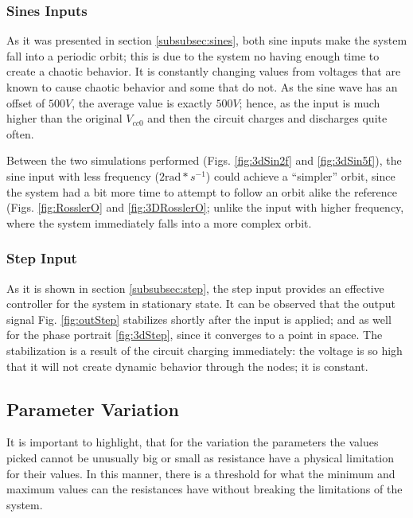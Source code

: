 \subsubsection{Sines Inputs}
As it was presented in section \ref{subsubsec:sines}, both sine inputs make the system fall into a periodic orbit; this is due to the system no having enough time to create a chaotic behavior. It is constantly changing values from voltages that are known to cause chaotic behavior and some that do not. As the sine wave has an offset of $500V$, the average value is exactly $500V$; hence, as the input is much higher than the original $V_{cc0}$ and then the circuit charges and discharges quite often.

Between the two simulations performed (Figs. \ref{fig:3dSin2f} and \ref{fig:3dSin5f}), the sine input with less frequency ($2\text{rad}*s^{-1}$) could achieve a ``simpler'' orbit, since the system had a bit more time to attempt to follow an orbit alike the reference (Figs. \ref{fig:RosslerO} and \ref{fig:3DRosslerO}; unlike the input with higher frequency, where the system immediately falls into a more complex orbit.

\subsubsection{Step Input}\label{subsubsec:stepAn}
As it is shown in section \ref{subsubsec:step}, the step input provides an effective controller for the system in stationary state. It can be observed that the output signal Fig. \ref{fig:outStep} stabilizes shortly after the input is applied; and as well for the phase portrait \ref{fig:3dStep}, since it converges to a point in space. The stabilization is a result of the circuit charging immediately: the voltage is so high that it will not create dynamic behavior through the nodes; it is constant.



\subsection{Parameter Variation}
It is important to highlight, that for the variation the parameters the values picked cannot be unusually big or small as resistance have a physical limitation for their values. In this manner, there is a threshold for what the minimum and maximum values can the resistances have without breaking the limitations of the system.

